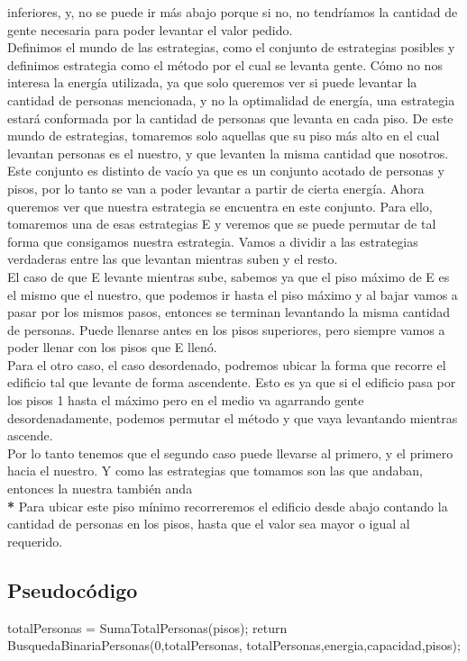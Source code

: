 inferiores, y, no se puede ir más abajo porque si no, no tendríamos la cantidad de gente necesaria para poder levantar el valor pedido.\\
Definimos el mundo de las estrategias, como el conjunto de estrategias posibles y definimos estrategia como el método por el cual se levanta gente. Cómo no nos interesa
la energía utilizada, ya que solo queremos ver si puede levantar la cantidad de personas mencionada, y no la optimalidad de energía, una estrategia estará conformada por la cantidad
de personas que levanta en cada piso. De este mundo de estrategias, tomaremos solo aquellas que su piso más alto en el cual levantan personas es el nuestro, y que
levanten la misma cantidad que nosotros. Este conjunto es distinto de vacío ya que es un conjunto acotado de personas y pisos, por lo tanto se van a poder levantar a partir de
cierta energía. Ahora queremos ver que nuestra estrategia se encuentra en este conjunto. Para ello, tomaremos una de esas estrategias E y veremos que se puede permutar de tal
forma que consigamos nuestra estrategia. Vamos a dividir a las estrategias verdaderas entre las que levantan mientras suben y el resto.\\
El caso de que E levante mientras sube, sabemos ya que el piso máximo de E es el mismo que 
el nuestro, que podemos ir hasta el piso máximo y al bajar vamos a pasar por los mismos pasos, entonces se terminan levantando la misma cantidad de personas. Puede llenarse antes en los pisos superiores, pero siempre vamos a poder
llenar con los pisos que E llenó.\\
Para el otro caso, el caso desordenado, podremos ubicar la forma que recorre el edificio tal que levante de forma ascendente. Esto es ya que si el edificio pasa por los pisos 1 hasta el máximo pero en el medio va agarrando gente
desordenadamente, podemos permutar el método y que vaya levantando mientras ascende. \\
Por lo tanto tenemos que el segundo caso puede llevarse al primero, y el primero hacia el nuestro. Y como las estrategias que tomamos son las que andaban, entonces la nuestra también anda\\

\footnotesize {\textbf{*} Para ubicar este piso mínimo recorreremos el edificio desde abajo contando la cantidad de personas en los pisos, hasta que el valor sea mayor o igual al requerido.}

\subsection{Pseudoc\'odigo}
\begin{codebox}
\li		totalPersonas = SumaTotalPersonas(pisos);
\li		return BusquedaBinariaPersonas(0,totalPersonas, totalPersonas,energia,capacidad,pisos);
\end{codebox}

